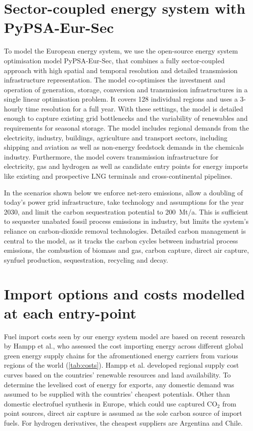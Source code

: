\documentclass[10pt,5p,reversenotenum,lefttitle]{elsarticle}
\begin{document}
\section*{Sector-coupled energy system with PyPSA-Eur-Sec}

To model the European energy system, we use the open-source energy system
optimisation model PyPSA-Eur-Sec,\cite{PyPSAEurSecSectorCoupled} that combines a
fully sector-coupled approach with high spatial and temporal resolution and
detailed transmission infrastructure representation. The model co-optimises the
investment and operation of generation, storage, conversion and transmission
infrastructures in a single linear optimisation problem. It covers 128
individual regions and uses a 3-hourly time resolution for a full year. With
these settings, the model is detailed enough to capture existing grid
bottlenecks and the variability of renewables and requirements for seasonal
storage. The model includes regional demands from the electricity, industry,
buildings, agriculture and transport sectors, including shipping and aviation as
well as non-energy feedstock demands in the chemicals industry. Furthermore, the
model covers transmission infrastructure for electricity, gas and hydrogen as
well as candidate entry points for energy imports like existing and prospective
LNG terminals and cross-continental pipelines. 

In the scenarios shown below we enforce net-zero emissions, allow a doubling of
today's power grid infrastructure, take technology and assumptions for the year
2030\cite{dea2019}, and limit the carbon sequestration potential to 200~Mt/a.
This is sufficient to sequester unabated fossil process emissions in industry,
but limits the system's reliance on carbon-dioxide removal technologies.
Detailed carbon management is central to the model, as it tracks the carbon
cycles between industrial process emissions, the combustion of biomass and gas,
carbon capture, direct air capture, synfuel production, sequestration, recycling
and decay. 

\section*{Import options and costs modelled at each entry-point}

Fuel import costs seen by our energy system model are based on recent research
by Hampp et al.\cite{hamppImportOptions2021}, who assessed the cost importing
energy across different global green energy supply chains for the afromentioned
energy carriers from various regions of the world (\cref{tab:costs}). Hampp et
al.\cite{hamppImportOptions2021} developed regional supply cost curves based on
the countries' renewable resources and land availability. To determine the
levelised cost of energy for exports, any domestic demand was assumed to be
supplied with the countries' cheapest potentials. Other than domestic
electrofuel synthesis in Europe, which could use captured CO$_2$ from point
sources, direct air capture is assumed as the sole carbon source of import
fuels. For hydrogen derivatives, the cheapest suppliers are Argentina and Chile.
\end{document}
